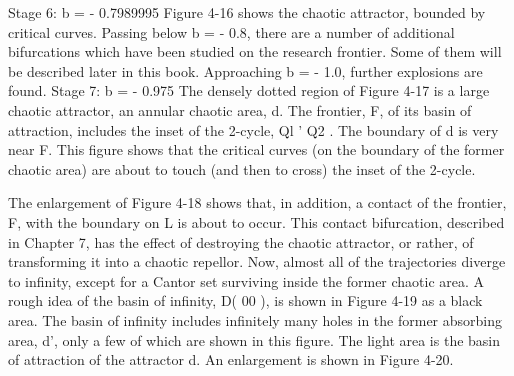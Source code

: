 \documentclass{article}
\begin{document}
Stage 6: b = - 0.7989995
Figure 4-16 shows the chaotic attractor, bounded by critical
curves. Passing below b = - 0.8, there are a number of additional
bifurcations which have been studied on the research frontier. Some
of them will be described later in this book. Approaching b = - 1.0,
further explosions are found.
Stage 7: b = - 0.975
The densely dotted region of Figure 4-17 is a large chaotic
attractor, an annular chaotic area, d. The frontier, F, of its basin of
attraction, includes the inset of the 2-cycle, {Ql ' Q2 }. The boundary
of d is very near F. This figure shows that the critical curves (on
the boundary of the former chaotic area) are about to touch (and
then to cross) the inset of the 2-cycle.

The enlargement of Figure 4-18 shows that, in addition, a contact
of the frontier, F, with the boundary on L is about to occur. This
contact bifurcation, described in Chapter 7, has the effect of
destroying the chaotic attractor, or rather, of transforming it into a
chaotic repellor. Now, almost all of the trajectories diverge to infinity,
except for a Cantor set surviving inside the former chaotic area.
A rough idea of the basin of infinity, D( 00 ), is shown in Figure
4-19 as a black area. The basin of infinity includes infinitely many
holes in the former absorbing area, d', only a few of which are
shown in this figure. The light area is the basin of attraction of the
attractor d. An enlargement is shown in Figure 4-20.
\end{document}
